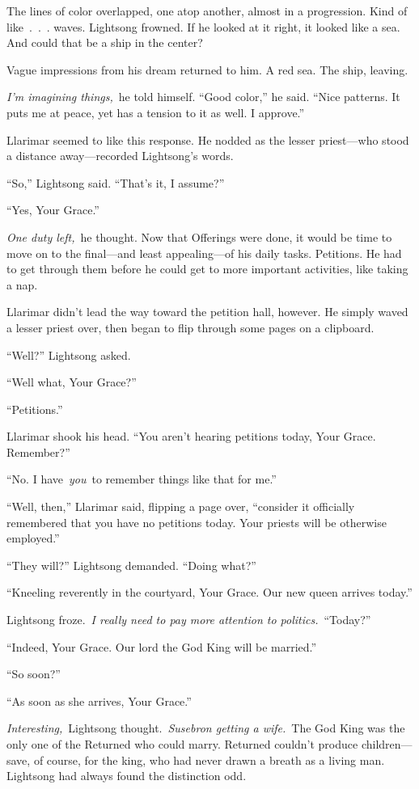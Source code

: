 The lines of color overlapped, one atop another, almost in a progression. Kind of like~.~.~. waves. Lightsong frowned. If he looked at it right, it looked like a sea. And could that be a ship in the center?

Vague impressions from his dream returned to him. A red sea. The ship, leaving.

\textit{I’m imagining things,}~he told himself. “Good color,” he said. “Nice patterns. It puts me at peace, yet has a tension to it as well. I approve.”

Llarimar seemed to like this response. He nodded as the lesser priest—who stood a distance away—recorded Lightsong’s words.

“So,” Lightsong said. “That’s it, I assume?”

“Yes, Your Grace.”

\textit{One duty left,}~he thought. Now that Offerings were done, it would be time to move on to the final—and least appealing—of his daily tasks. Petitions. He had to get through them before he could get to more important activities, like taking a nap.

Llarimar didn’t lead the way toward the petition hall, however. He simply waved a lesser priest over, then began to flip through some pages on a clipboard.

“Well?” Lightsong asked.

“Well what, Your Grace?”

“Petitions.”

Llarimar shook his head. “You aren’t hearing petitions today, Your Grace. Remember?”

“No. I have~\textit{you}~to remember things like that for me.”

“Well, then,” Llarimar said, flipping a page over, “consider it officially remembered that you have no petitions today. Your priests will be otherwise employed.”

“They will?” Lightsong demanded. “Doing what?”

“Kneeling reverently in the courtyard, Your Grace. Our new queen arrives today.”

Lightsong froze.~\textit{I really need to pay more attention to politics.}~“Today?”

“Indeed, Your Grace. Our lord the God King will be married.”

“So soon?”

“As soon as she arrives, Your Grace.”

\textit{Interesting,}~Lightsong thought.~\textit{Susebron getting a wife.}~The God King was the only one of the Returned who could marry. Returned couldn’t produce children—save, of course, for the king, who had never drawn a breath as a living man. Lightsong had always found the distinction odd.

